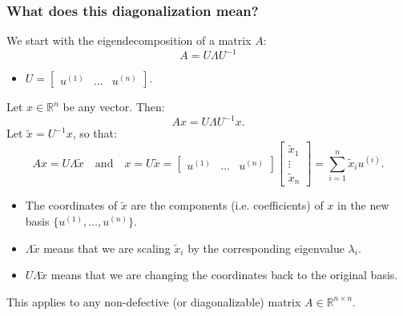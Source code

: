 \subsubsection{What does this diagonalization mean?}
\begin{intuition}
    We start with the eigendecomposition of a matrix \( A \):
    \[
    A = U \Lambda U^{-1}
    \]
    \begin{itemize}
        \item $U = \begin{bmatrix} u^{(1)} & \dots & u^{(n)} \end{bmatrix}.$
    \end{itemize}
    \vspace{1em}

    Let \( x \in \mathbb{R}^n \) be any vector. Then:
    \[
    A x = U \Lambda U^{-1} x.
    \]
    Let \( \tilde{x} = U^{-1} x \), so that:
    \[
    A x = U \Lambda \tilde{x} \quad \text{and} \quad x = U \tilde{x} = \begin{bmatrix} u^{(1)} & \dots & u^{(n)} \end{bmatrix} \begin{bmatrix} \tilde{x}_1 \\ \vdots \\ \tilde{x}_n \end{bmatrix} = \sum_{i=1}^{n} \tilde{x}_i u^{(i)}.
    \]
    \begin{itemize}
        \item The coordinates of \( \tilde{x} \) are the components (i.e. coefficients) of \( x \) in the new basis \( \{u^{(1)}, \dots, u^{(n)}\} \).
        \item \( \Lambda \tilde{x} \) means that we are scaling \( \tilde{x}_i \) by the corresponding eigenvalue \( \lambda_i \).
        \item \( U \Lambda \tilde{x} \) means that we are changing the coordinates back to the original basis.
    \end{itemize}
    \vspace{1em}

    This applies to any non-defective (or diagonalizable) matrix \( A \in \mathbb{R}^{n \times n} \).
\end{intuition}
